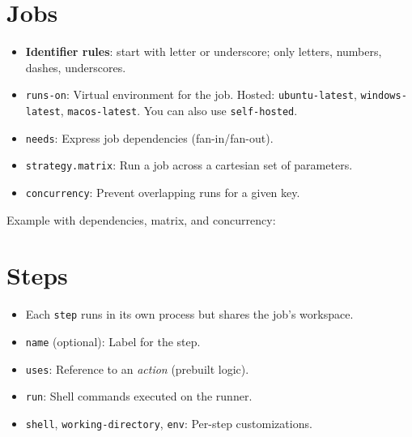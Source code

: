 \documentclass[11pt]{article}
\begin{document}
\section{Jobs}
\begin{itemize}
  \item \textbf{Identifier rules}: start with letter or underscore; only letters, numbers, dashes, underscores.
  \item \texttt{runs-on}: Virtual environment for the job. Hosted: \texttt{ubuntu-latest}, \texttt{windows-latest}, \texttt{macos-latest}. You can also use \texttt{self-hosted}.
  \item \texttt{needs}: Express job dependencies (fan-in/fan-out).
  \item \texttt{strategy.matrix}: Run a job across a cartesian set of parameters.
  \item \texttt{concurrency}: Prevent overlapping runs for a given key.
\end{itemize}

\noindent Example with dependencies, matrix, and concurrency:
\clearpage

\section{Steps}
\begin{itemize}
  \item Each \texttt{step} runs in its own process but shares the job's workspace.
  \item \texttt{name} (optional): Label for the step.
  \item \texttt{uses}: Reference to an \emph{action} (prebuilt logic).
  \item \texttt{run}: Shell commands executed on the runner.
  \item \texttt{shell}, \texttt{working-directory}, \texttt{env}: Per-step customizations.
\end{itemize}
\end{document}

